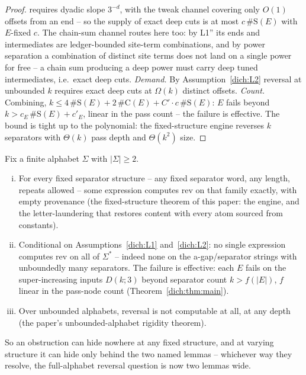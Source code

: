 \begin{proof}
    requires dyadic slope $3^{-d}$, with the tweak channel covering
    only $O(1)$ offsets from an end -- so the supply of exact deep
    cuts is at most $c\,\#\mathrm{S}(E)$ with $E$-fixed $c$.  The
    chain-sum channel routes here too: by L1'' its ends and
    intermediates are ledger-bounded site-term combinations, and by
    power separation a combination of distinct site terms does not
    land on a single power for free -- a chain sum producing a deep
    power must carry deep tuned intermediates, i.e.\ exact deep cuts.
    \emph{Demand.}  By Assumption~\ref{dich:L2} reversal at
    unbounded $k$ requires exact deep cuts at $\Omega(k)$ distinct
    offsets.  \emph{Count.}  Combining,
    $k \le 4\,\#\mathrm{S}(E) + 2\,\#\mathrm{C}(E) + C' \cdot
    c\,\#\mathrm{S}(E)$: $E$ fails beyond
    $k > c_E\,\#\mathrm{S}(E) + c'_E$, linear in the pass count --
    the failure is effective.  The bound is tight up to the
    polynomial: the fixed-structure engine reverses $k$ separators
    with $\Theta(k)$ pass depth and $\Theta(k^2)$ size.
\end{proof}

\begin{theorem}
    \label{dich:thm:dichotomy}
    Fix a finite alphabet $\Sigma$ with $|\Sigma| \ge 2$.
    \begin{enumerate}[(i)]
        \item For every fixed separator structure -- any fixed
        separator word, any length, repeats allowed -- some expression
        computes $\mathrm{rev}$ on that family exactly, with empty
        provenance (the fixed-structure theorem of this paper: the
        engine, and the letter-laundering that restores content with
        every atom sourced from constants).
        \item Conditional on Assumptions~\ref{dich:L1}
        and~\ref{dich:L2}: no single expression computes
        $\mathrm{rev}$ on all of $\Sigma^*$ -- indeed none on the
        a-gap/separator strings with unboundedly many separators.  The
        failure is effective: each $E$ fails on the super-increasing
        inputs $D(k;3)$ beyond separator count $k > f(|E|)$, $f$
        linear in the pass-node count (Theorem~\ref{dich:thm:main}).
        \item Over unbounded alphabets, reversal is not computable at
        all, at any depth (the paper's unbounded-alphabet rigidity
        theorem).
    \end{enumerate}
    So an obstruction can hide nowhere at any fixed structure, and at
    varying structure it can hide only behind the two named lemmas --
    whichever way they resolve, the full-alphabet reversal question
    is now two lemmas wide.
\end{theorem}


